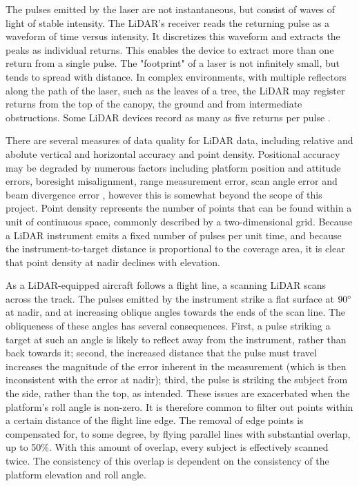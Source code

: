 \documentclass[10pt,a4paper]{report}
\begin{document}
The pulses emitted by the laser are not instantaneous, but consist of waves of light of stable intensity. The LiDAR's receiver reads the returning pulse as a waveform of time versus intensity. It discretizes this waveform and extracts the peaks as individual returns. This enables the device to extract more than one return from a single pulse. The "footprint" of a laser is not infinitely small, but tends to spread with distance. In complex environments, with multiple reflectors along the path of the laser, such as the leaves of a tree, the LiDAR may register returns from the top of the canopy, the ground and from intermediate obstructions. Some LiDAR devices record as many as five returns per pulse \cite{Lillesand1999}.

There are several measures of data quality for LiDAR data, including relative and abolute vertical and horizontal accuracy and point density. Positional accuracy may be degraded by numerous factors including platform position and attitude errors, boresight misalignment, range measurement error, scan angle error and beam divergence error \cite{May2007}, however this is somewhat beyond the scope of this project. Point density represents the number of points that can be found within a unit of continuous space, commonly described by a two-dimensional grid. Because a LiDAR instrument emits a fixed number of pulses per unit time, and because the instrument-to-target distance is proportional to the coverage area, it is clear that point density at nadir declines with elevation. 

As a LiDAR-equipped aircraft follows a flight line, a scanning LiDAR scans across the track. The pulses emitted by the instrument strike a flat surface at $90\degree$ at nadir, and at increasing oblique angles towards the ends of the scan line. The obliqueness of these angles has several consequences. First, a pulse striking a target at such an angle is likely to reflect away from the instrument, rather than back towards it; second, the increased distance that the pulse must travel increases the magnitude of the error inherent in the measurement (which is then inconsistent with the error at nadir); third, the pulse is striking the subject from the side, rather than the top, as intended. These issues are exacerbated when the platform's roll angle is non-zero. It is therefore common to filter out points within a certain distance of the flight line edge. The removal of edge points is compensated for, to some degree, by flying parallel lines with substantial overlap, up to 50\%. With this amount of overlap, every subject is effectively scanned twice. The consistency of this overlap is dependent on the consistency of the platform elevation and roll angle.
\end{document}
